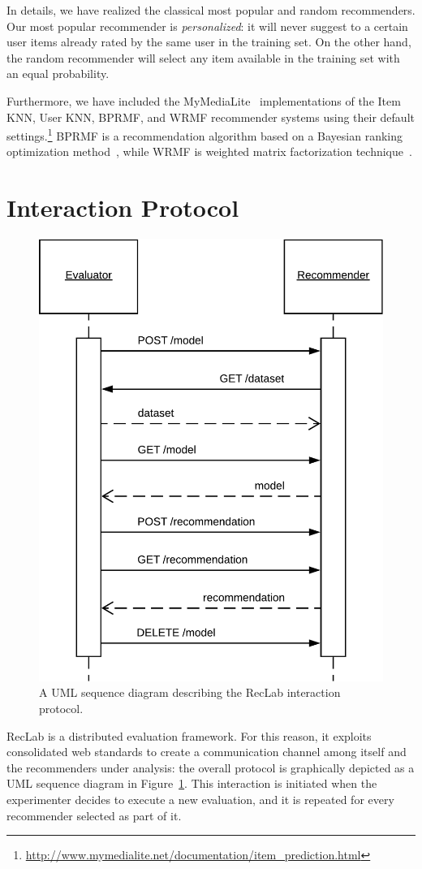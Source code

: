 In details, we have realized the classical most popular and random recommenders. Our most popular recommender is \emph{personalized}: it will never suggest to a certain user items already rated by the same user in the training set. On the other hand, the random recommender will select any item available in the training set with an equal probability.

Furthermore, we have included the MyMediaLite~\cite{Gantner2011} implementations of the Item KNN, User KNN, BPRMF, and WRMF recommender systems using their default settings.\footnote{\url{http://www.mymedialite.net/documentation/item_prediction.html}} BPRMF is a recommendation algorithm based on a Bayesian ranking optimization method~\cite{Rendle2009}, while WRMF is weighted matrix factorization technique~\cite{Hu2008}.

\section{Interaction Protocol}
\label{lab:sec:interaction}

\begin{figure}
\centering
\includegraphics[width=.65\linewidth]{uml}
\caption[RecLab interaction protocol]{A UML sequence diagram describing the RecLab interaction protocol.}
\label{lab:fig:sequence}
\end{figure}

RecLab is a distributed evaluation framework. For this reason, it exploits consolidated web standards to create a communication channel among itself and the recommenders under analysis: the overall protocol is graphically depicted as a UML sequence diagram in Figure~\ref{lab:fig:sequence}. This interaction is initiated when the experimenter decides to execute a new evaluation, and it is repeated for every recommender selected as part of it.

